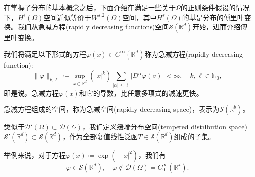 在掌握了分布的基本概念之后，下面介绍在满足一些关于$\Omega$的正则条件假设的情况下，$H^{s}(\Omega)$空间近似等价于$W^{s,2}(\Omega)$空间，其中$H^{s}(\Omega)$的基是分布的傅里叶变换。我们从急减方程(rapidly decreasing functions)空间$\mathcal{S} \left( \mathbb{R}^d \right)$开始，进而介绍傅里叶变换。

\begin{definition}[急减方程空间]
  我们将满足以下形式的方程$\varphi(x) \in C^{\infty}(\mathbb{R}^d)$称为急减方程(rapidly decreasing function):
  \begin{equation*}
    \big\|  \varphi \big\|_{k,\ell} \coloneqq
    \sup_{x \in \mathbb{R}^d} \left( \left| x  \right|^k  \right)
    \sum_{\left| \alpha \right| \le \ell } \big| D^{\alpha} \varphi(x) \big| < \infty, \quad k,\ell \in \mathbb{N}_0,
  \end{equation*}
  即是说，急减方程$\varphi(x)$和它的导数，比任意多项式的减速更快。

  急减方程组成的空间，称为急减空间(rapidly decreasing space)，表示为$\mathcal{S}(\mathbb{R}^b)$。

  类似于$\mathcal{D}'(\Omega) \subset \mathcal{D}(\Omega)$，我们定义缓增分布空间(tempered distribution space) $\mathcal{S}'(\mathbb{R}^d) \subset \mathcal{S}(\mathbb{R}^d)$，作为全部复值线性泛函$T \in \mathcal{S}(\mathbb{R}^{d})$组成的子集。
\end{definition}

举例来说，对于方程$\varphi(x) \coloneqq \exp(- \left| x \right|^2)$，我们有
\begin{equation*}
    \varphi \in \mathcal{S}(\mathbb{R}^d), \quad \varphi \notin \mathcal{D}(\Omega) = C_0^{\infty}(\mathbb{R}^d).
\end{equation*}

